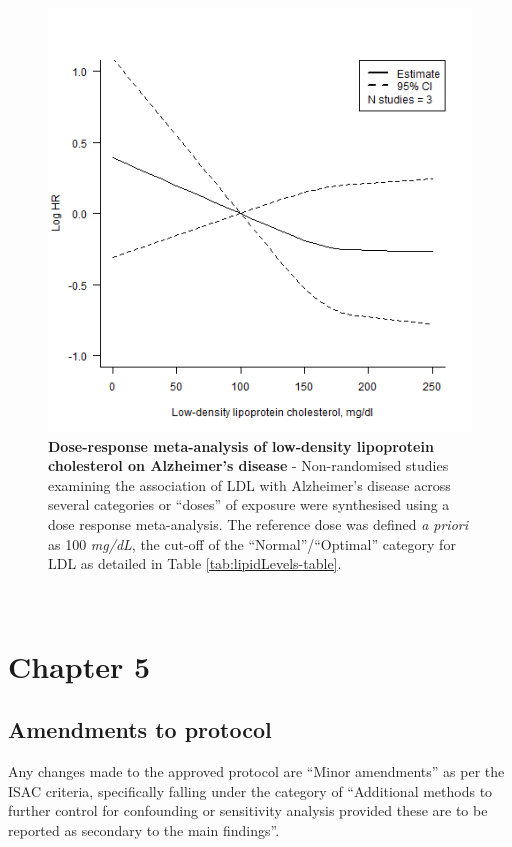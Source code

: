 \documentclass[a4paper, twoside]{templates/ociamthesis}
\begin{document}
\begin{figure}[H]

{\centering \includegraphics[width=0.6\linewidth]{figures/sys-rev/dr_AD_LDL} 

}

\caption[Dose-response meta-analysis of low-density lipoprotein cholesterol on Alzheimer's disease]{\textbf{Dose-response meta-analysis of low-density lipoprotein cholesterol on Alzheimer's disease} - Non-randomised studies examining the association of LDL with Alzheimer's disease across several categories or ``doses'' of exposure were synthesised using a dose response meta-analysis. The reference dose was defined \emph{a priori} as 100 \emph{mg/dL}, the cut-off of the ``Normal''/``Optimal'' category for LDL as detailed in Table \ref{tab:lipidLevels-table}.}\label{fig:drAdLDL}
\end{figure}

~

\hypertarget{appendix-cprd-analysis}{%
\section{Chapter 5}\label{appendix-cprd-analysis}}

\hypertarget{appendix-cprd-amendments}{%
\subsection{Amendments to protocol}\label{appendix-cprd-amendments}}

Any changes made to the approved protocol are ``Minor amendments'' as per the ISAC criteria, specifically falling under the category of ``Additional methods to further control for confounding or sensitivity analysis provided these are to be reported as secondary to the main findings''.
\end{document}
